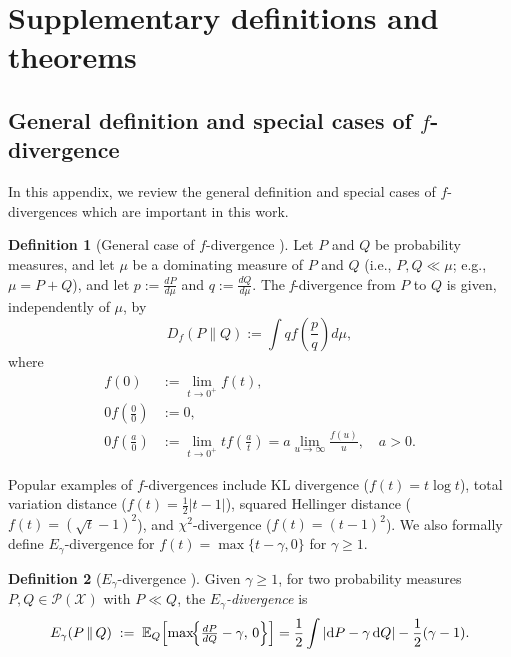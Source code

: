 \documentclass[accepted]{article}
\theoremstyle{plain} %
\theoremstyle{definition}
\newtheorem{definition}{Definition}[section]
\theoremstyle{remark}
\begin{document}
\section{Supplementary definitions and theorems
}\label{appendix: Supplementary Definitions and Theorems}

\subsection{\texorpdfstring{General definition and special cases of $f$-divergence}{f-divergence}}\label{subsec: f-div} 

In this appendix, we review the general definition and special cases of $f$-divergences which are important in this work. 

\begin{definition}[General case of $f$-divergence \citep{sason2016f}]\label{def: general f-div}
    Let \( P \) and \( Q \) be probability measures, and let \( \mu \) be a dominating measure of \( P \) and \( Q \) (i.e., \( P, Q \ll \mu \); e.g., \( \mu = P + Q \)), and let \( p := \frac{dP}{d\mu} \) and \( q := \frac{dQ}{d\mu} \). The \textit{f}-divergence from \( P \) to \( Q \) is given, independently of \( \mu \), by
\begin{equation}
    D_f(P\|Q) := \int q f\left( \frac{p}{q} \right) d\mu,
\end{equation}
\noindent where
\begin{align}
    f(0) &:= \lim_{t \to 0^+} f(t), \\
    0 f\left( \frac{0}{0} \right) &:= 0, \\
    0 f\left( \frac{a}{0} \right) &:= \lim_{t \to 0^+} t f\left( \frac{a}{t} \right) = a \lim_{u \to \infty} \frac{f(u)}{u}, \quad a > 0.
\end{align}
\end{definition}


Popular examples of $f$-divergences include KL divergence ($f(t) = t\log t$), total variation distance ($f(t) =\frac{1}{2} |t-1|$), squared Hellinger distance ($f(t) = (\sqrt{t} - 1)^2$), and $\chi^2$-divergence ($f(t) = (t-1)^2$). We also formally define $E_\gamma$-divergence for  \( f(t) = \max\{t - \gamma, 0\} \) for \( \gamma \geq 1 \).

\begin{definition}[$E_\gamma$-divergence \citep{sharma2013fundamental}]
\label{def:Egamma-divergence}
Given $\gamma \geq 1$, for two probability measures $P,Q \in \mathcal{P}(\mathcal{X})$ with $P \ll Q$, the
\emph{$E_\gamma$-divergence} is
\[
    E_\gamma(P \,\|\, Q)
    \;:=\;
    \mathbb{E}_Q\!\left[
        \max\!\Bigl\{\tfrac{dP}{dQ}-\gamma,\,0\Bigr\}
    \right]= \frac{1}{2} \int \left| \mathrm{d}P - \gamma\,\mathrm{d}Q \right| - \frac{1}{2} (\gamma - 1).
\]
\end{definition}
\end{document}
